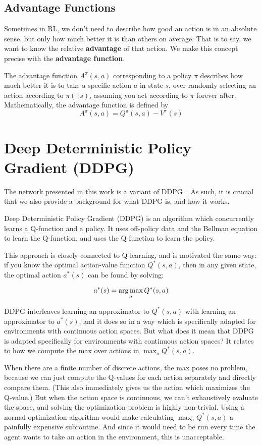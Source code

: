 \subsection{Advantage Functions}
Sometimes in RL, we don't need to describe how good an action is in an absolute sense, but only how much better it is than others on average. That is to say, we want to know the relative \textbf{advantage} of that action. We make this concept precise with the \textbf{advantage function}.

The advantage function $A^{\pi}(s, a)$ corresponding to a policy $\pi$ describes how much better it is to take a specific action $a$ in state $s$, over randomly selecting an action according to $\pi(\cdot|s)$, assuming you act according to $\pi$ forever after. Mathematically, the advantage function is defined by
\begin{equation}
A^{\pi}(s, a) = Q^{\pi}(s, a) - V^{\pi}(s)
\end{equation}

\section{Deep Deterministic Policy Gradient (DDPG)}
The network presented in this work is a variant of DDPG~\cite{xie_learning_2018}. As such, it is crucial that we also provide a background for what DDPG is, and how it works.

Deep Deterministic Policy Gradient (DDPG) is an algorithm which concurrently learns a Q-function and a policy. It uses off-policy data and the Bellman equation to learn the Q-function, and uses the Q-function to learn the policy.

This approach is closely connected to Q-learning, and is motivated the same way: if you know the optimal action-value function $Q^{*}(s,a)$, then in any given state, the optimal action $a^{*}(s)$ can be found by solving:

\begin{equation}
a^{*}(s) = \operatorname*{arg\,max}_{a} Q^*(s,a)
\end{equation}

DDPG interleaves learning an approximator to $Q^*(s,a)$ with learning an approximator to $a^*(s)$, and it does so in a way which is specifically adapted for environments with continuous action spaces. But what does it mean that DDPG is adapted specifically for environments with continuous action spaces? It relates to how we compute the max over actions in $\max_a Q^*(s,a)$.

When there are a finite number of discrete actions, the max poses no problem, because we can just compute the Q-values for each action separately and directly compare them. (This also immediately gives us the action which maximizes the Q-value.) But when the action space is continuous, we can't exhaustively evaluate the space, and solving the optimization problem is highly non-trivial. Using a normal optimization algorithm would make calculating $\max_a Q^*(s,a)$ a painfully expensive subroutine. And since it would need to be run every time the agent wants to take an action in the environment, this is unacceptable.

